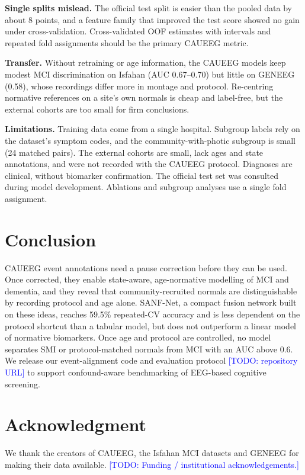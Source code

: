 \documentclass[conference]{IEEEtran}
\newcommand{\todo}[1]{\textcolor{blue}{[TODO: #1]}}   %
\begin{document}
\textbf{Single splits mislead.} The official test split is easier than the pooled data by about 8 points,
and a feature family that improved the test score showed no gain under cross-validation.
Cross-validated OOF estimates with intervals and repeated fold assignments should be the primary
CAUEEG metric.

\textbf{Transfer.} Without retraining or age information, the CAUEEG models keep modest MCI
discrimination on Isfahan (AUC 0.67--0.70) but little on GENEEG (0.58), whose recordings differ more
in montage and protocol.
Re-centring normative references on a site's own normals is cheap and label-free, but the external
cohorts are too small for firm conclusions.

\textbf{Limitations.} Training data come from a single hospital. Subgroup labels rely on the dataset's
symptom codes, and the community-with-photic subgroup is small (24 matched pairs). The external
cohorts are small, lack ages and state annotations, and were not recorded with the CAUEEG protocol.
Diagnoses are clinical, without biomarker confirmation. The official test set was consulted during
model development. Ablations and subgroup analyses use a single fold assignment.

\section{Conclusion}
CAUEEG event annotations need a pause correction before they can be used. Once corrected, they enable
state-aware, age-normative modelling of MCI and dementia, and they reveal that community-recruited
normals are distinguishable by recording protocol and age alone. SANF-Net, a compact fusion network
built on these ideas, reaches 59.5\% repeated-CV accuracy and is less dependent on the protocol
shortcut than a tabular model, but does not outperform a linear model of normative biomarkers. Once age
and protocol are controlled, no model separates SMI or protocol-matched normals from MCI with an AUC
above 0.6. We release our event-alignment code and evaluation protocol \todo{repository URL} to
support confound-aware benchmarking of EEG-based cognitive screening.

\section*{Acknowledgment}
We thank the creators of CAUEEG, the Isfahan MCI datasets and GENEEG for making their data available.
\todo{Funding / institutional acknowledgements.}



\end{document}
